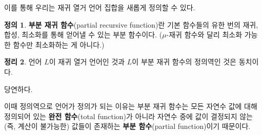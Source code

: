\documentclass[b5paper, 11pt]{book}
\theoremstyle{definition}
\newtheorem{defn}{정의}[chapter]
\newtheorem{thm}[defn]{정리}
\newenvironment{pf*}{\pushQED{\qed}\pf}
{\popQED\endpf}
\begin{document}
이를 통해 우리는 재귀 열거 언어 집합을 새롭게 정의할 수 있다.
\begin{defn}
    \textbf{부분 재귀 함수}(partial recursive function)란 기본 함수들의 유한 번의 재귀, 합성, 최소화를 통해 얻어낼 수 있는 부분 함수이다. ($\mu$-재귀 함수와 달리 최소화 가능한 함수만 최소화하는 게 아니다.)
\end{defn}
\begin{thm}
    언어 $L$이 재귀 열거 언어인 것과 $L$이 부분 재귀 함수의 정의역인 것은 동치이다. 
\end{thm}
\begin{pf*}
    당연하다.
\end{pf*}
이때 정의역으로 언어가 정의가 되는 이유는 부분 재귀 함수는 모든 자연수 값에 대해 정의되어 있는 \textbf{완전 함수}(total function)가 아니라 자연수 중에 값이 결정되지 않는(즉, 계산이 불가능한) 값들이 존재하는 \textbf{부분 함수}(partial function)이기 때문이다.
\end{document}
